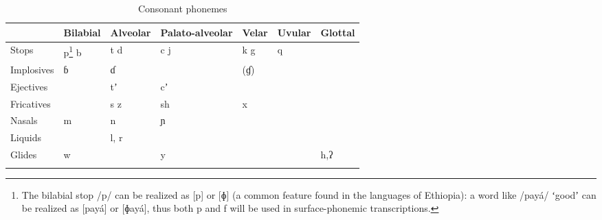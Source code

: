 \documentclass[output=paper]{LSP/langsci}
\begin{document}
\begin{table}
\caption{Consonant phonemes}
\label{tab:Petrollino:1}
 \begin{tabular}{lllllll} %
  \lsptoprule
            & Bilabial & Alveolar & Palato-alveolar & Velar & Uvular & Glottal\\ %
  \midrule
Stops		& p\footnote{The bilabial stop /p/ can be realized as [p] or [ɸ] (a common feature found in the languages of Ethiopia): a word like /payá/ ʻgoodʼ can be realized as [payá] or [ɸayá], thus both p and f will be used in surface-phonemic transcriptions.}  b	& t d & c j & k g & q &  \\
Implosives	& ɓ 	&  ɗ  &  	& 	(ɠ) &   &  \\
Ejectives	&   	&  tʼ &  cʼ	&  	  &   &  \\
Fricatives	&    	& s z &  sh &  x  &   &  \\
Nasals		& m   	& n   & ɲ   & 	  &   &  \\
Liquids		&    	& l, r 	  &     &     &   &  \\
Glides		&    w	&  	  &   y  &     &   & h,ʔ \\
  \lspbottomrule
 \end{tabular}
\end{table}
\end{document}
